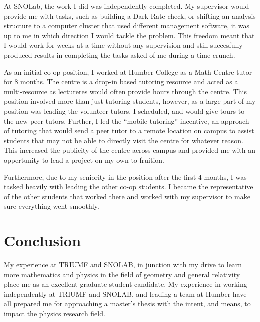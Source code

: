 \documentclass[12pt]{article}
\begin{document}
At SNOLab, the work I did was independently completed. My supervisor would provide me with tasks, such as building a Dark Rate check, or shifting an analysis structure to a computer cluster that used different management software, it was up to me in which direction I would tackle the problem. This freedom meant that I would work for weeks at a time without any supervision and still succesfully produced results in completing the tasks asked of me during a time crunch. 

As an initial co-op position, I worked at Humber College as a Math Centre tutor for 8 months. The centre is a drop-in based tutoring resource and acted as a multi-resource as lectureres would often provide hours through the centre. This position involved more than just tutoring students, however, as a large part of my position was leading the volunteer tutors. I scheduled, and would give tours to the new peer tutors. Further, I led the ``mobile tutoring'' incentive, an approach of tutoring that would send a peer tutor to a remote location on campus to assist students that may not be able to directly visit the centre for whatever reason. This increased the publicity of the centre across campus and provided me with an oppertunity to lead a project on my own to fruition.

Furthermore, due to my seniority in the position after the first 4 months, I was tasked heavily with leading the other co-op students. I became the representative of the other students that worked there and worked with my supervisor to make sure everything went smoothly.

\section{Conclusion}

My experience at TRIUMF and SNOLAB, in junction with my drive to learn more mathematics and physics in the field of geometry and general relativity place me as an excellent graduate student candidate. My experience in working independently at TRIUMF and SNOLAB, and leading a team at Humber have all prepared me for approaching a master's thesis with the intent, and means, to impact the physics research field. 
\end{document}
